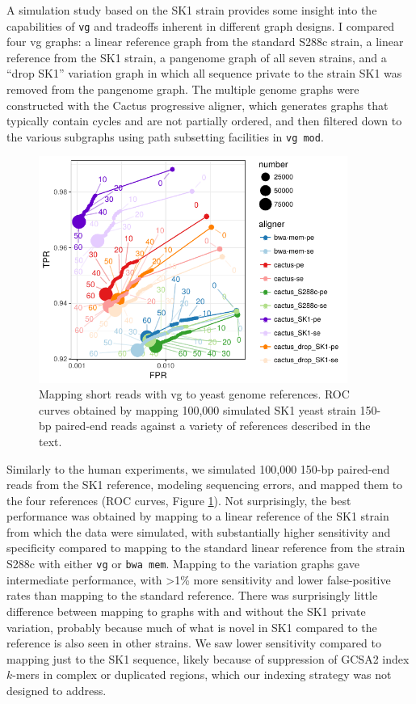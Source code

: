 A simulation study based on the SK1 strain provides some insight into the capabilities of {\tt vg} and tradeoffs inherent in different graph designs.
I compared four vg graphs: a linear reference graph from the standard S288c strain, a linear reference from the SK1 strain, a pangenome graph of all seven strains, and a ``drop SK1'' variation graph in which all sequence private to the strain SK1 was removed from the pangenome graph.
The multiple genome graphs were constructed with the Cactus progressive aligner, which generates graphs that typically contain cycles and are not partially ordered, and then filtered down to the various subgraphs using path subsetting facilities in {\tt vg mod}.

\begin{figure}[htbp!]
  \centering
  \includegraphics[width=0.9\textwidth]{Chapter3/Figs/e68fc338_test_sim_yeast_cactus-roc.pdf}
  \caption[Cactus yeast simulation]{Mapping short reads with vg to yeast genome references.
    ROC curves obtained by mapping 100,000 simulated SK1 yeast strain 150-bp paired-end reads against a variety of references described in the text.}
  \label{fig:cactus_yeast_sim}
\end{figure}


Similarly to the human experiments, we simulated 100,000 150-bp paired-end reads from the SK1 reference, modeling sequencing errors, and mapped them to the four references (ROC curves, Figure \ref{fig:cactus_yeast_sim}).
Not surprisingly, the best performance was obtained by mapping to a linear reference of the SK1 strain from which the data were simulated, with substantially higher sensitivity and specificity compared to mapping to the standard linear reference from the strain S288c with either {\tt vg} or {\tt bwa mem}.
Mapping to the variation graphs gave intermediate performance, with >1\% more sensitivity and lower false-positive rates than mapping to the standard reference.
There was surprisingly little difference between mapping to graphs with and without the SK1 private variation, probably because much of what is novel in SK1 compared to the reference is also seen in other strains.
We saw lower sensitivity compared to mapping just to the SK1 sequence, likely because of suppression of GCSA2 index $k$-mers in complex or duplicated regions, which our indexing strategy was not designed to address.

